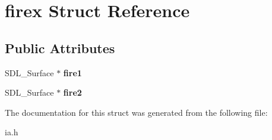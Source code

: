 \hypertarget{structfirex}{}\section{firex Struct Reference}
\label{structfirex}
\subsection*{Public Attributes}
\begin{DoxyCompactItemize}
\item 
\mbox{\label{structfirex_a5c3030f2b859db89d4fd83458a4201f7}} 
S\+D\+L\+\_\+\+Surface $\ast$ {\bfseries fire1}
\item 
\mbox{\label{structfirex_ad0e98fd735fa54b004b726225d0d31c8}} 
S\+D\+L\+\_\+\+Surface $\ast$ {\bfseries fire2}
\end{DoxyCompactItemize}


The documentation for this struct was generated from the following file\+:\begin{DoxyCompactItemize}
\item 
ia.\+h\end{DoxyCompactItemize}
